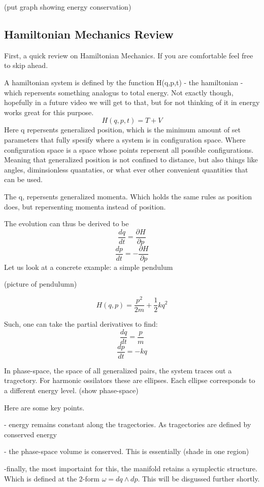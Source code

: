 (put graph showing energy conservation)
\subsection{Hamiltonian Mechanics Review}
First, a quick review on Hamiltonian Mechanics. If you are comfortable feel free to skip ahead.

A hamiltonian system is defined by the function H(q,p,t) - the hamiltonian - which repersents something analogus to total energy. Not exactly though, hopefully in a future video we will get to that, but for not thinking of it in energy works great for this purpose.
\[
H(q,p,t) = T + V
\]
Here q repersents generalized position, which is the minimum amount of set parameters that fully spesify where a system is in configuration space. Where configuration space is a space whose points repersent all possible configurations. Meaning that generalized position is not confined to distance, but also things like angles, diminsionless quantaties, or what ever other convenient quantities that can be used.

The q, repersents generalized momenta. Which holds the same rules as position does, but repersenting momenta instead of position.

The evolution can thus be derived to be
\[
\frac{dq}{dt} = \frac{\partial H}{\partial p}
\]
\[
\frac{dp}{dt} = -\frac{\partial H}{\partial p}
\]
Let us look at a concrete example: a simple pendulum

(picture of pendulumn)

\[
H(q,p) = \frac{p^2}{2m} + \frac{1}{2} kq^2
\]

Such, one can take the partial derivatives to find:
\[
\frac{dq}{dt} = \frac{p}{m}
\]
\[
\frac{dp}{dt} = -kq
\]

In phase-space, the space of all generalized pairs, the system traces out a tragectory. For harmonic ossilators these are ellipses. Each ellipse corresponds to a different energy level.
(show phase-space)

Here are some key points.

- energy remains constant along the tragectories. As tragectories are defined by conserved energy

- the phase-space volume is conserved. This is essentially
(shade in one region)

-finally, the most importaint for this, the manifold retains a symplectic structure. Which is defined at the 2-form $ \omega = dq \wedge dp$. This will be disgussed further shortly.

